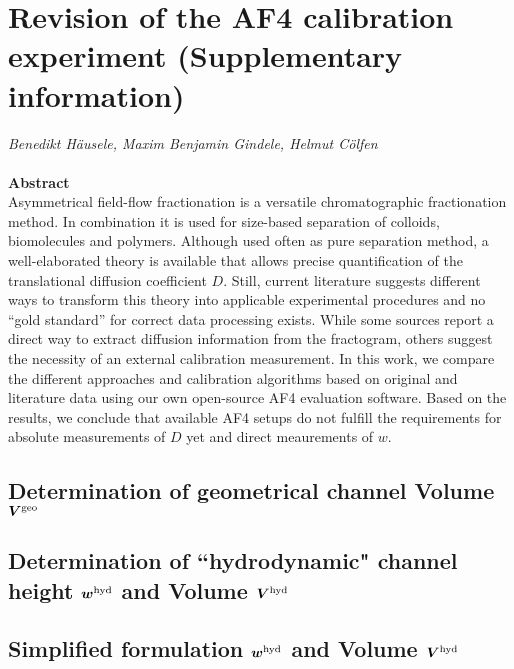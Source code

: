 \chapter*{Revision of the AF4 calibration experiment (Supplementary information)}
  
\emph{Benedikt Häusele, Maxim Benjamin Gindele, Helmut Cölfen}\\
\noindent\hrulefill\\
\textbf{Abstract}\\

Asymmetrical field-flow fractionation is a versatile chromatographic fractionation method. In combination it is used 
for size-based separation of colloids, biomolecules and polymers. Although used often as pure separation method, a 
well-elaborated theory is available that allows precise quantification of the translational diffusion coefficient $D$. 
Still, current literature suggests different ways to transform this theory into applicable experimental procedures and 
no “gold standard” for correct data processing exists. While some sources report a direct way to extract diffusion 
information from the fractogram, others suggest the necessity of an external calibration measurement. In this work, we 
compare the different approaches and calibration algorithms based on original and literature data using our own 
open-source AF4 evaluation software. Based on the results, we conclude that available AF4 setups do not fulfill the 
requirements for absolute measurements of $D$ yet and direct meaurements of $w$.

\noindent\hrulefill
\section*{Determination of geometrical channel Volume $\bm{V^\text{geo}}$}


\clearpage
\section*{Determination of ``hydrodynamic" channel height $\bm{w^\text{hyd}}$ and Volume $\bm{V^\text{hyd}}$}


\section*{Simplified formulation $\bm{w^\text{hyd}}$ and Volume $\bm{V^\text{hyd}}$}


